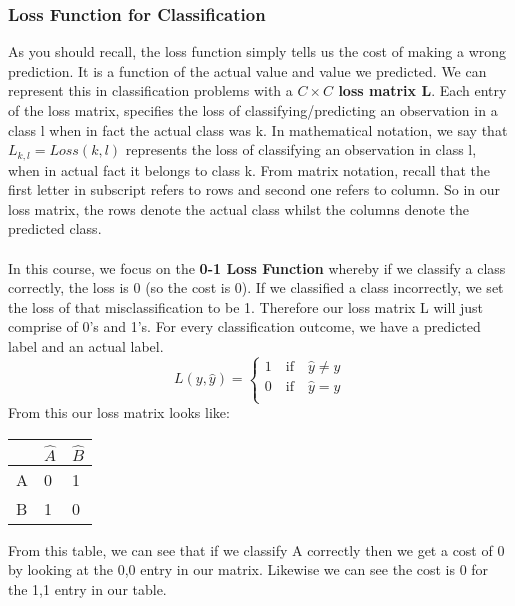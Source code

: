 \documentclass[11pt, oneside]{article}
\theoremstyle{definition}
\begin{document}
\subsubsection{Loss Function for Classification}
As you should recall, the loss function simply tells us the cost of making a wrong prediction. It is a function of the actual value and value we predicted. We can represent this in classification problems with a \textbf{ $C\times C$  loss matrix L}. Each entry of the loss matrix, specifies the loss of classifying/predicting an observation in a class l when in fact the actual class was k. In mathematical notation, we say that $L_{k,l} = Loss(k,l)$ represents the loss of classifying an observation in class l, when in actual fact it belongs to class k. From matrix notation, recall that the first letter in subscript refers to rows and second one refers to column. So in our loss matrix, the rows denote the actual class whilst the columns denote the predicted class.\\\\
In this course, we focus on the \textbf{0-1 Loss Function} whereby if we classify a class correctly, the loss is 0 (so the cost is 0). If we classified a class incorrectly, we set the loss of that misclassification to be 1. Therefore our loss matrix L will just comprise of 0's and 1's. For every classification outcome, we have a predicted label and an actual label.
\[
L(y,\hat{y}) = \left\{
\begin{array}{ll}
      1  \quad \textrm{if} \quad \hat{y} \neq y\\
      0  \quad \textrm{if} \quad \hat{y} = y\\
\end{array}
\right.
\]
From this our loss matrix looks like:
\begin{center}
\begin{tabu} to 0.8\textwidth { | X[l] | X[c] | X[r] | }
 \hline
  & $\hat{A}$  & $\hat{B}$ \\
 \hline
 A  & 0  & 1  \\
\hline
 B  & 1  & 0  \\
\hline
\end{tabu}
\end{center}
From this table, we can see that if we classify A correctly then we get a cost of 0 by looking at the 0,0 entry in our matrix. Likewise we can see the cost is 0 for the 1,1 entry in our table.
\end{document}
